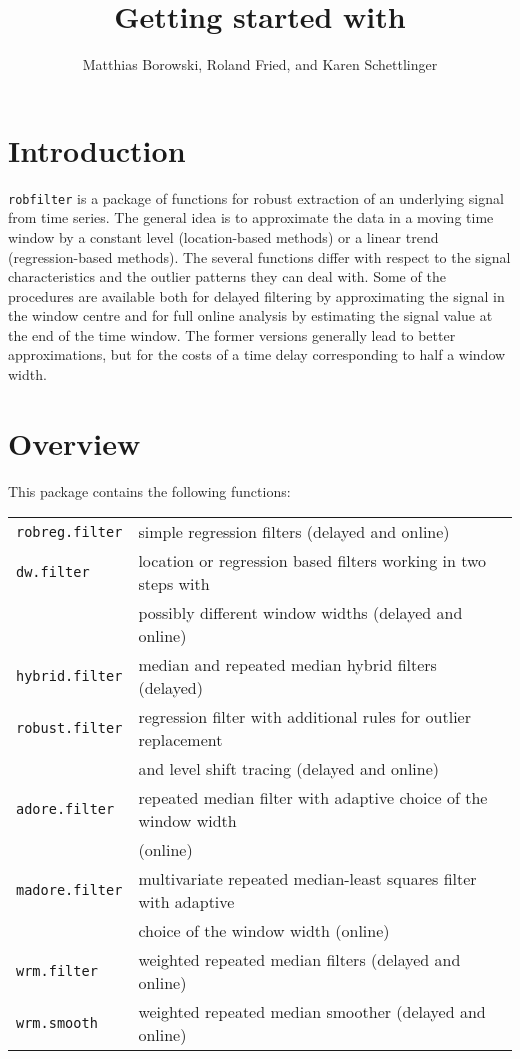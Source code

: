 \documentclass[a4paper]{scrartcl}
\title{Getting started with \robfilter}
\author{Matthias Borowski, Roland Fried, and Karen Schettlinger}
\date{}
\newcommand*{\robfilter}{\texttt{robfilter} }
\begin{document}
\maketitle

\section{Introduction}

\robfilter is a package of functions for robust extraction of an underlying signal from time series.
The general idea is to approximate the data in a moving time
window by a constant level (location-based methods) or a linear
trend (regression-based methods). The several functions differ
with respect to the signal characteristics and the outlier
patterns they can deal with. Some of the procedures are available
both for delayed filtering by approximating the signal in the
window centre and for full online analysis by estimating the
signal value at the end of the time window. The former versions
generally lead to better approximations, but for the costs of a
time delay corresponding to half a window width.

\section{Overview}

This package contains the following functions: \vspace*{0.25cm} \\
\begin{tabular}{ll}
\texttt{robreg.filter} & simple regression filters (delayed and online) \\
\texttt{dw.filter}     & location or regression based filters working in two steps with \\
                       & possibly different window widths (delayed and online)\\
\texttt{hybrid.filter} & median and repeated median hybrid filters (delayed)\\
\texttt{robust.filter} & regression filter with additional rules for outlier replacement \\
                       & and level shift tracing (delayed and online)\\
\texttt{adore.filter}  & repeated median filter with adaptive choice of the window width\\
                       & (online)\\
\texttt{madore.filter} & multivariate repeated median-least squares filter with adaptive\\
											 & choice of the window width (online)\\
\texttt{wrm.filter}    & weighted repeated median filters (delayed and online)\\
\texttt{wrm.smooth}    & weighted repeated median smoother (delayed and online)
\end{tabular} \vspace*{0.25cm}
\end{document}
